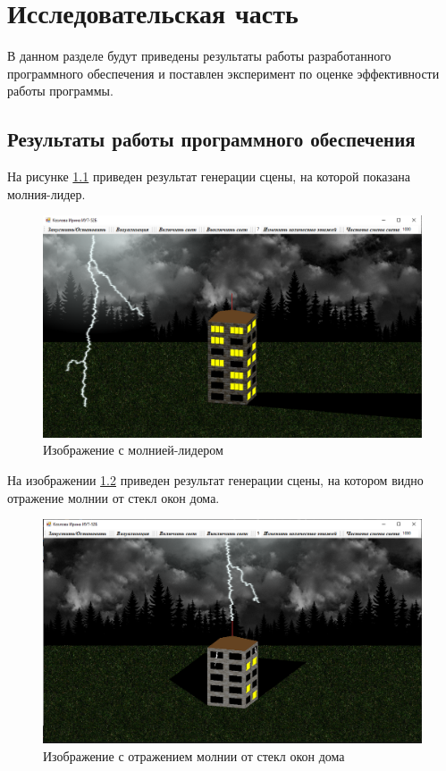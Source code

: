 \chapter{Исследовательская часть}

В данном разделе будут приведены результаты работы разработанного программного обеспечения и поставлен эксперимент по оценке эффективности работы программы.

\section{Результаты работы программного обеспечения}

На рисунке \ref{img:t1} приведен результат генерации сцены, на которой показана молния-лидер.

\begin{figure}[H]
	\begin{center}
		\includegraphics[scale=0.38]{img/prog_res/t1.png}
	\end{center}
	\captionsetup{justification=centering}
	\caption{Изображение с молнией-лидером}
	\label{img:t1}
\end{figure}

На изображении \ref{img:t2} приведен результат генерации сцены, на котором видно отражение молнии от стекл окон дома.

\begin{figure}[H]
	\begin{center}
		\includegraphics[scale=0.38]{img/prog_res/t2.png}
	\end{center}
	\captionsetup{justification=centering}
	\caption{Изображение с отражением молнии от стекл окон дома}
	\label{img:t2}
\end{figure}

